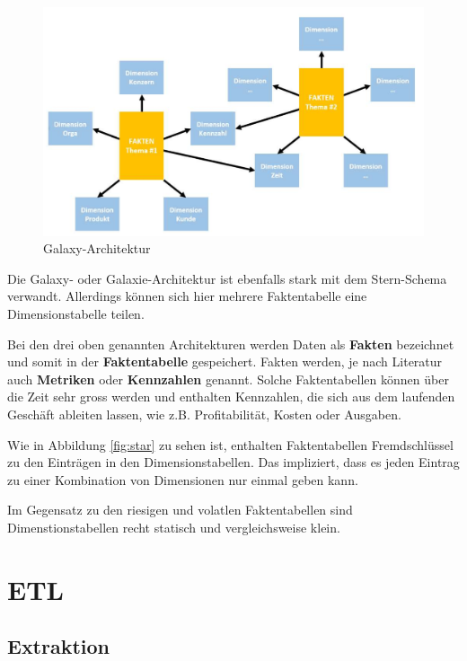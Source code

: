 \documentclass[a4paper, 11pt, nofootinbib]{article}
\begin{document}
\begin{figure}
	\centering
	\includegraphics[keepaspectratio=true,height=15\baselineskip]{galaxy.PNG}
	\caption{Galaxy-Architektur}
	\label{fig:galaxy}
\end{figure}

Die Galaxy- oder Galaxie-Architektur ist ebenfalls stark mit dem Stern-Schema verwandt. Allerdings können sich hier mehrere Faktentabelle eine Dimensionstabelle teilen.

\vspace{20px}

\noindent Bei den drei oben genannten Architekturen werden Daten als \textbf{Fakten} bezeichnet und somit in der \textbf{Faktentabelle} gespeichert. Fakten werden, je nach Literatur auch \textbf{Metriken} oder \textbf{Kennzahlen} genannt. Solche Faktentabellen können über die Zeit sehr gross werden und enthalten Kennzahlen, die sich aus dem laufenden Geschäft ableiten lassen, wie z.B. Profitabilität, Kosten oder Ausgaben.

Wie in Abbildung \ref{fig:star} zu sehen ist, enthalten Faktentabellen Fremdschlüssel zu den Einträgen in den Dimensionstabellen. Das impliziert, dass es jeden Eintrag zu einer Kombination von Dimensionen nur einmal geben kann.

Im Gegensatz zu den riesigen und volatlen Faktentabellen sind Dimenstionstabellen recht statisch und vergleichsweise klein. 

\section{ETL}
\subsection{Extraktion}
\end{document}
